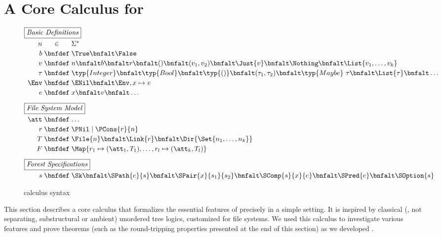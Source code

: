 \section{A Core Calculus for \forest{}}
\label{sec:theory}

\begin{figure}
\[
\begin{array}{r@{\;}c@{\;}l@{\quad}l@{}}
\multicolumn{3}{@{}l}{\fbox{\textit{Basic Definitions}}}\\[1ex]
n    & \in & \Sigma^{\ast} \\[.5ex]
b    & \bnfdef & \True \bnfalt \False\\[.5ex]
v    & \bnfdef & n \bnfalt b \bnfalt r \bnfalt () \bnfalt (v_1,v_2) \bnfalt \Just{v} \bnfalt \Nothing \bnfalt \List{v_1,\ldots,v_k}\\[.5ex]
\tau & \bnfdef & \typ{Integer} \bnfalt \typ{Bool} \bnfalt \typ{()} \bnfalt (\tau_1,\tau_2) \bnfalt \typ{Maybe}~\tau \bnfalt \List{\tau} \bnfalt \dots\\[.5ex]
\Env & \bnfdef & \ENil \bnfalt \Env,x\mapsto v \\[.5ex]
e    & \bnfdef & x \bnfalt v \bnfalt \dots \\[2ex]
%
\multicolumn{3}{@{}l}{\fbox{\textit{File System Model}}}\\[1ex]
\att & \bnfdef & \dots\\[.5ex]
r    & \bnfdef & \PNil \mid \PCons{r}{n} \\[.5ex]
T    & \bnfdef & \File{n} \bnfalt \Link{r} \bnfalt \Dir{ \Set{n_1,\ldots,n_k} }\\[.5ex]
F    & \bnfdef & \Map{ r_1 \mapsto (\att_1,T_1), \ldots, r_l \mapsto (\att_k,T_l) }\\[2ex]
%
\multicolumn{3}{@{}l}{\fbox{\textit{Forest Specifications}}}\\[1ex]
s    & \bnfdef & \Sk \bnfalt \SPath{e}{s} \bnfalt \SPair{x}{s_1}{s_2} \bnfalt 
                 \SComp{s}{x}{e} \bnfalt \SPred{e} \bnfalt \SOption{s}         
\end{array}
\]
\caption{\forest{} calculus syntax}
\label{fig:csyntax}
\end{figure}

This section describes a core calculus that formalizes the essential
features of \forest{} precisely in a simple setting. It is inspired by
classical (\ie{}, not separating, substructural or ambient) unordered
tree logics, customized for file systems. We used this calculus to
investigate various features and prove theorems (such as the
round-tripping properties presented at the end of this section) as we
developed \forest{}.

